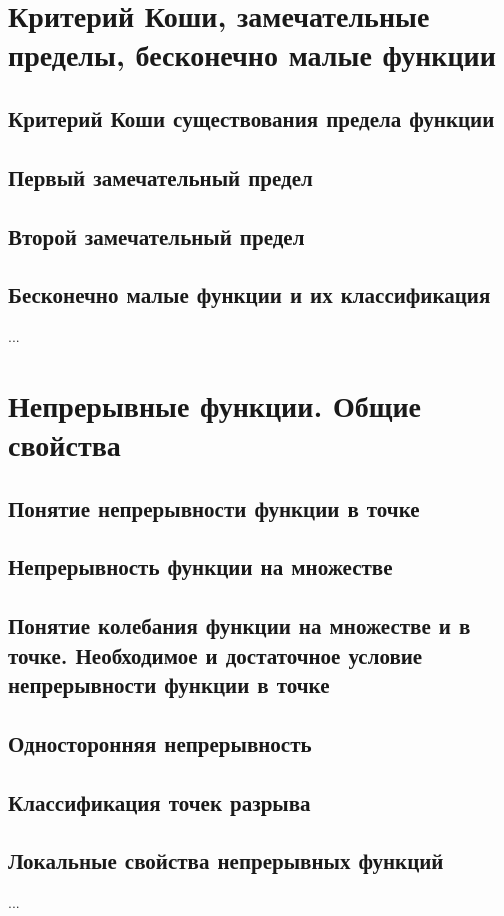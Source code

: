 \section{Критерий Коши, замечательные пределы, бесконечно малые функции}
\subsection{Критерий Коши существования предела функции}
\subsection{Первый замечательный предел}
\subsection{Второй замечательный предел}
\subsection{Бесконечно малые функции и их классификация}
...

\section{Непрерывные функции. Общие свойства}
\subsection{Понятие непрерывности функции в точке}

\subsection{Непрерывность функции на множестве}

\subsection{Понятие колебания функции на множестве и в точке. Необходимое и достаточное условие непрерывности функции в точке}

\subsection{Односторонняя непрерывность}
\subsection{Классификация точек разрыва}
\subsection{Локальные свойства непрерывных функций}
...

